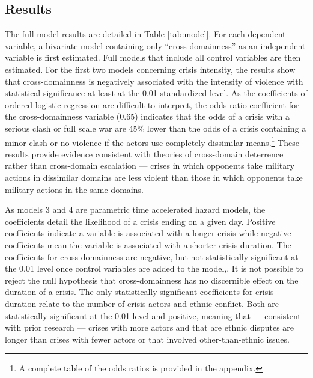 \documentclass[
]{article}
\begin{document}
\hypertarget{results}{%
\subsection{Results}\label{results}}

The full model results are detailed in Table \ref{tab:model}. For each dependent variable, a bivariate model containing only ``cross-domainness'' as an independent variable is first estimated. Full models that include all control variables are then estimated. For the first two models concerning crisis intensity, the results show that cross-domainness is negatively associated with the intensity of violence with statistical significance at least at the 0.01 standardized level. As the coefficients of ordered logistic regression are difficult to interpret, the odds ratio coefficient for the cross-domainness variable (0.65) indicates that the odds of a crisis with a serious clash or full scale war are 45\% lower than the odds of a crisis containing a minor clash or no violence if the actors use completely dissimilar means.\footnote{A complete table of the odds ratios is provided in the appendix.} These results provide evidence consistent with theories of cross-domain deterrence rather than cross-domain escalation --- crises in which opponents take military actions in dissimilar domains are less violent than those in which opponents take military actions in the same domains.

As models 3 and 4 are parametric time accelerated hazard models, the coefficients detail the likelihood of a crisis ending on a given day. Positive coefficients indicate a variable is associated with a longer crisis while negative coefficients mean the variable is associated with a shorter crisis duration. The coefficients for cross-domainness are negative, but not statistically significant at the 0.01 level once control variables are added to the model,. It is not possible to reject the null hypothesis that cross-domainness has no discernible effect on the duration of a crisis. The only statistically significant coefficients for crisis duration relate to the number of crisis actors and ethnic conflict. Both are statistically significant at the 0.01 level and positive, meaning that --- consistent with prior research --- crises with more actors and that are ethnic disputes are longer than crises with fewer actors or that involved other-than-ethnic issues.
\end{document}
